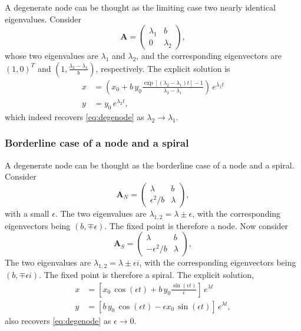 \documentclass{book}
\begin{document}
A degenerate node can be thought as the limiting case two nearly identical eigenvalues.  Consider
$$
\mathbf A =
\left(
  \begin{array}{cc}
    \lambda_1 & b \\
    0 & \lambda_2
  \end{array}
\right),
$$
whose two eigenvalues are $\lambda_1$ and $\lambda_2$,
and the corresponding eigenvectors are
$(1, 0)^T$ and $(1, \frac{\lambda_2 - \lambda_1}{b})$,
respectively.
The explicit solution is
$$
\begin{aligned}
  x &= \left(x_0 + b \, y_0 \frac{ \exp[(\lambda_2 - \lambda_1) t] - 1 }{\lambda_2 -\lambda_1} \right) \, e^{\lambda_1 t} \\
  y &= y_0 \, e^{\lambda_2 t},
\end{aligned}
$$
which indeed recovers \eqref{eq:degenode} as $\lambda_2 \rightarrow \lambda_1$.


\subsubsection{Borderline case of a node and a spiral}

A degenerate node can be thought as the borderline case of a node and a spiral.  Consider
$$
\mathbf A_N =
\left(
  \begin{array}{cc}
    \lambda & b \\
    \epsilon^2/b & \lambda
  \end{array}
\right),
$$
with a small $\epsilon$.
The two eigenvalues are $\lambda_{1,2} = \lambda \pm \epsilon$,
with the corresponding eigenvectors being $(b, \mp \epsilon)$.
The fixed point is therefore a node.
Now consider
$$
\mathbf A_S =
\left(
  \begin{array}{cc}
    \lambda & b \\
    -\epsilon^2/b & \lambda
  \end{array}
\right),
$$
The two eigenvalues are $\lambda_{1,2} = \lambda \pm \epsilon i$,
with the corresponding eigenvectors being $(b, \mp \epsilon i)$.
The fixed point is therefore a spiral.
The explicit solution,
$$
\begin{aligned}
  x &= \left[x_0 \, \cos(\epsilon t)+ b \, y_0 \frac{ \sin(\epsilon t) }{\epsilon} \right] \, e^{\lambda t} \\
  y &= \left[b \, y_0 \, \cos(\epsilon t) - \epsilon x_0 \, \sin(\epsilon t) \right] \, e^{\lambda t},
\end{aligned}
$$
also recovers \eqref{eq:degenode} as $\epsilon \rightarrow 0$.
\end{document}
